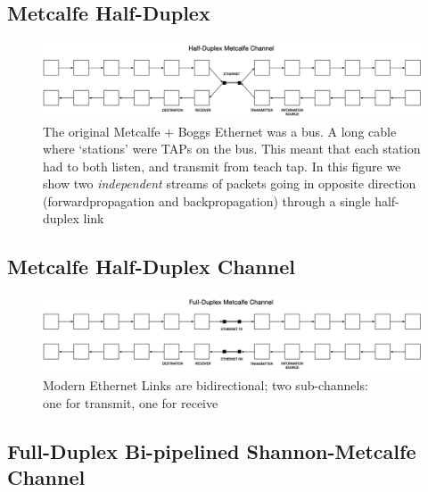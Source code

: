 
\subsection{Metcalfe Half-Duplex}

\begin{figure}
\includegraphics[width=\textwidth]{./figures/Half-Duplex-Metcalfe.png}
  \caption{The original Metcalfe + Boggs Ethernet was a bus. A long cable where `stations' were TAPs on the bus. This meant that each station had to both listen, and transmit from teach tap. In this figure we show two \emph{independent} streams of packets going in opposite direction (forwardpropagation and backpropagation) through a single half-duplex link}
\end{figure}



\subsection{Metcalfe Half-Duplex Channel}

\begin{figure}
\includegraphics[width=\textwidth]{./figures/Full-Duplex-Metcalfe.png}
  \caption{Modern Ethernet Links are bidirectional; two sub-channels: \\one for transmit,  one for receive}
\end{figure}



\subsection{Full-Duplex Bi-pipelined Shannon-Metcalfe Channel}

